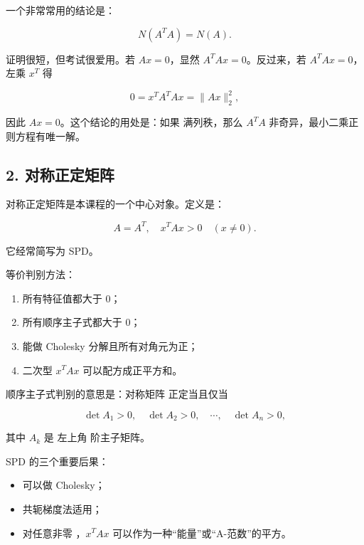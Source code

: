 \documentclass[11pt,a4paper]{ctexart}
\newcommand{\code}[1]{\begingroup\ttfamily\small #1\endgroup}
\begin{document}
一个非常常用的结论是：

\[
N(A^TA)=N(A).
\]

证明很短，但考试很爱用。若 $Ax=0$，显然 $A^TAx=0$。反过来，若 $A^TAx=0$，左乘 $x^T$ 得

\[
0=x^TA^TAx=\|Ax\|_2^2,
\]

因此 $Ax=0$。这个结论的用处是：如果 \code{} 满列秩，那么 $A^TA$ 非奇异，最小二乘正则方程有唯一解。


\subsection*{2. 对称正定矩阵}


对称正定矩阵是本课程的一个中心对象。定义是：

\[
A=A^T,\quad x^TAx>0\quad (x\ne 0).
\]

它经常简写为 SPD。

等价判别方法：

\begin{enumerate}

\item 所有特征值都大于 0；

\item 所有顺序主子式都大于 0；

\item 能做 Cholesky 分解且所有对角元为正；

\item 二次型 $x^TAx$ 可以配方成正平方和。

\end{enumerate}

顺序主子式判别的意思是：对称矩阵 \code{} 正定当且仅当

\[
\det A_1>0,\quad \det A_2>0,\quad \cdots,\quad \det A_n>0,
\]

其中 $A_k$ 是 \code{} 左上角 \code{} 阶主子矩阵。

SPD 的三个重要后果：

\begin{itemize}

\item 可以做 Cholesky；

\item 共轭梯度法适用；

\item 对任意非零 \code{}，$x^TAx$ 可以作为一种“能量”或“A-范数”的平方。

\end{itemize}
\end{document}
